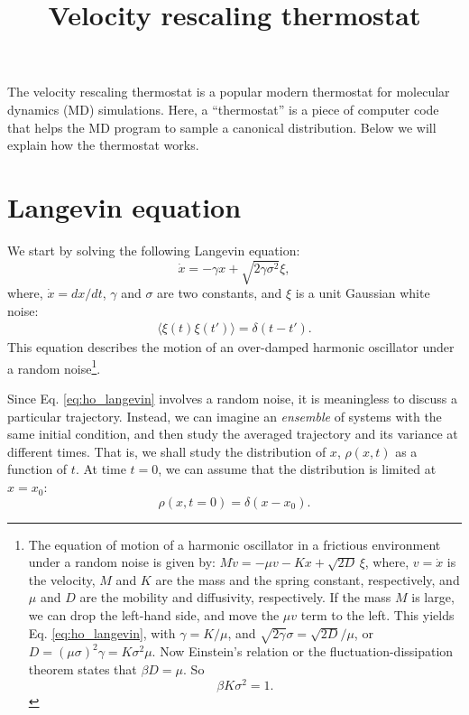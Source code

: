 \documentclass[11pt]{article}
\begin{document}
\title{ Velocity rescaling thermostat }
\author{ \vspace{-10ex} }
\date{ \vspace{-10ex} }
\maketitle



The velocity rescaling thermostat is a popular modern thermostat
for molecular dynamics (MD) simulations.
%
Here, a ``thermostat'' is a piece of computer code
that helps the MD program to sample a canonical distribution.
%
Below we will explain how the thermostat works.



\section{Langevin equation}



We start by solving the following Langevin equation:
%
\begin{equation}
  \dot x = -\gamma x + \sqrt{ 2 \gamma \sigma^2 } \xi,
  \label{eq:ho_langevin}
\end{equation}
where,
$\dot x = dx/dt$,
$\gamma$ and $\sigma$ are two constants,
and $\xi$ is a unit Gaussian white noise:
\begin{align}
  \langle \xi(t) \xi(t') \rangle
=
  \delta(t - t').
\end{align}
This equation describes the motion of an over-damped harmonic oscillator
under a random noise\footnote{
%
%
%
The equation of motion of a harmonic oscillator
in a frictious environment
under a random noise is given by:
$M \dot v = -\mu v - K x + \sqrt{ 2 D } \, \xi$,
where, $v = \dot x$ is the velocity,
$M$ and $K$ are the mass and the spring constant, respectively,
and $\mu$ and $D$ are the mobility and diffusivity, respectively.
%
If the mass $M$ is large, we can drop the left-hand side,
and move the $\mu v$ term to the left.
%
This yields Eq. \eqref{eq:ho_langevin},
with $\gamma = K/\mu$,
and $\sqrt{2\gamma} \sigma = \sqrt{2 D}/\mu$,
%
or
$D = (\mu \sigma)^2 \gamma = K \sigma^2 \mu$.
%
Now Einstein's relation or the fluctuation-dissipation theorem
states that $\beta D = \mu$.
So
\begin{equation}
  \beta K \sigma^2 = 1.
  \label{eq:bKsig2}
\end{equation}
%
%
%
}.

Since Eq. \eqref{eq:ho_langevin} involves a random noise,
it is meaningless to discuss a particular trajectory.
%
Instead, we can imagine an \emph{ensemble} of systems
with the same initial condition,
and then study the averaged trajectory
and its variance at different times.
%
That is, we shall study the distribution
of $x$, $\rho(x, t)$ as a function of $t$.
%
At time $t = 0$, we can assume that the distribution
is limited at $x = x_0$:
%
\begin{equation}
  \rho(x, t = 0) = \delta(x - x_0).
  \label{eq:rho_t0}
\end{equation}
\end{document}

